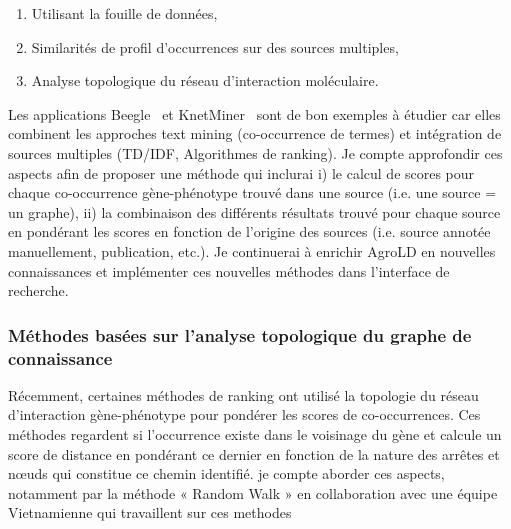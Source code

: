 \begin{enumerate}
\item Utilisant la fouille de données, 
\item Similarités de profil d’occurrences sur des sources multiples, 
\item Analyse topologique du réseau d’interaction moléculaire. \\
\end{enumerate}

Les applications Beegle~\cite{ElShal2016,Tranchevent2016a} et KnetMiner~\cite{Hassani-Pak2017a} sont de bon exemples à étudier car elles combinent les approches text mining (co-occurrence de termes) et intégration de sources multiples (TD/IDF, Algorithmes de ranking). Je compte approfondir ces aspects afin de proposer une méthode qui inclurai i) le calcul de scores pour chaque co-occurrence gène-phénotype trouvé dans une source (i.e. une source = un graphe), ii) la combinaison des différents résultats trouvé pour chaque source en pondérant les scores en fonction de l’origine des sources (i.e. source annotée manuellement, publication, etc.). Je continuerai à enrichir AgroLD en nouvelles connaissances et implémenter ces nouvelles méthodes dans l’interface de recherche. 

\subsubsection*{Méthodes basées sur l’analyse topologique du graphe de connaissance}

Récemment, certaines méthodes de ranking ont utilisé la topologie du réseau d’interaction gène-phénotype pour pondérer les scores de co-occurrences. Ces méthodes regardent si l’occurrence existe dans le voisinage du gène et calcule un score de distance en pondérant ce dernier en fonction de la nature des arrêtes et nœuds qui constitue ce chemin identifié. je compte aborder ces aspects, notamment par la méthode « Random Walk » en collaboration avec une équipe Vietnamienne qui travaillent sur ces methodes~\cite{Le2012,Le2013}

